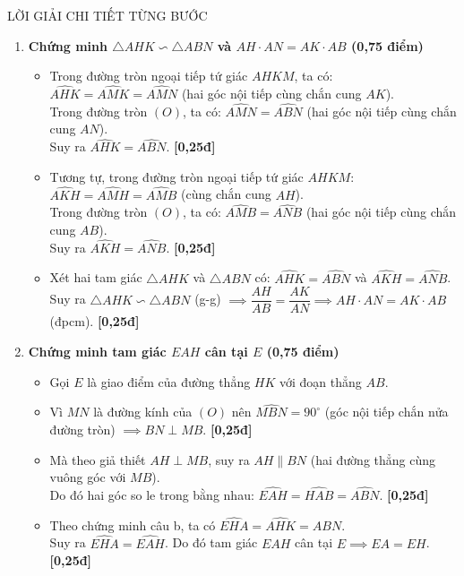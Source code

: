\documentclass[11pt,a4paper]{article}
\begin{document}
\begin{solutionbox}{LỜI GIẢI CHI TIẾT TỪNG BƯỚC}
\begin{enumerate}[label=\textbf{\arabic*.}, leftmargin=*]
    \vspace{1mm}
    \item \textbf{Chứng minh $\triangle AHK \backsim \triangle ABN$ và $AH \cdot AN = AK \cdot AB$ (0,75 điểm)}
    \begin{itemize}[leftmargin=*, nosep]
        \item Trong đường tròn ngoại tiếp tứ giác $AHKM$, ta có: $\widehat{AHK} = \widehat{AMK} = \widehat{AMN}$ (hai góc nội tiếp cùng chắn cung $AK$).\\
        Trong đường tròn $(O)$, ta có: $\widehat{AMN} = \widehat{ABN}$ (hai góc nội tiếp cùng chắn cung $AN$).\\
        Suy ra $\widehat{AHK} = \widehat{ABN}$. \hfill \textbf{[0,25đ]}
        \item Tương tự, trong đường tròn ngoại tiếp tứ giác $AHKM$: $\widehat{AKH} = \widehat{AMH} = \widehat{AMB}$ (cùng chắn cung $AH$).\\
        Trong đường tròn $(O)$, ta có: $\widehat{AMB} = \widehat{ANB}$ (hai góc nội tiếp cùng chắn cung $AB$).\\
        Suy ra $\widehat{AKH} = \widehat{ANB}$. \hfill \textbf{[0,25đ]}
        \item Xét hai tam giác $\triangle AHK$ và $\triangle ABN$ có: $\widehat{AHK} = \widehat{ABN}$ và $\widehat{AKH} = \widehat{ANB}$.\\
        Suy ra $\triangle AHK \backsim \triangle ABN$ (g-g) $\implies \dfrac{AH}{AB} = \dfrac{AK}{AN} \implies AH \cdot AN = AK \cdot AB$ (đpcm). \hfill \textbf{[0,25đ]}
    \end{itemize}

    \vspace{1mm}
    \item \textbf{Chứng minh tam giác $EAH$ cân tại $E$ (0,75 điểm)}
    \begin{itemize}[leftmargin=*, nosep]
        \item Gọi $E$ là giao điểm của đường thẳng $HK$ với đoạn thẳng $AB$.
        \item Vì $MN$ là đường kính của $(O)$ nên $\widehat{MBN} = 90^\circ$ (góc nội tiếp chắn nửa đường tròn) $\implies BN \perp MB$. \hfill \textbf{[0,25đ]}
        \item Mà theo giả thiết $AH \perp MB$, suy ra $AH \parallel BN$ (hai đường thẳng cùng vuông góc với $MB$).\\
        Do đó hai góc so le trong bằng nhau: $\widehat{EAH} = \widehat{HAB} = \widehat{ABN}$. \hfill \textbf{[0,25đ]}
        \item Theo chứng minh câu b, ta có $\widehat{EHA} = \widehat{AHK} = \widehat{ABN}$.\\
        Suy ra $\widehat{EHA} = \widehat{EAH}$. Do đó tam giác $EAH$ cân tại $E \implies EA = EH$. \hfill \textbf{[0,25đ]}
    \end{itemize}


\end{enumerate}
\end{solutionbox}
\end{document}
